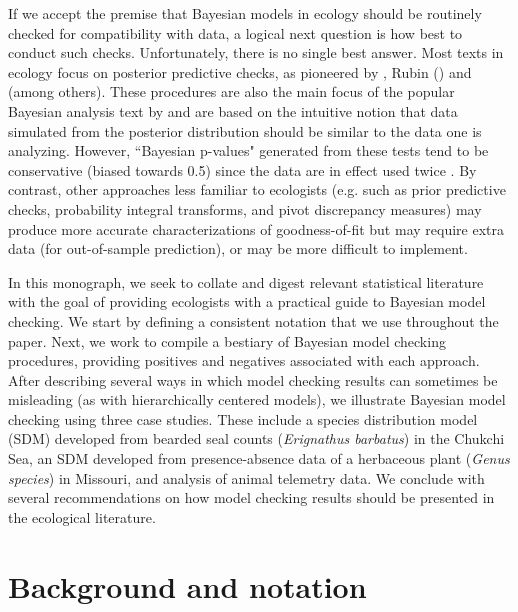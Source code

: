 \documentclass[12pt,english]{article}
\begin{document}
\begin{spacing}{1.9}
If we accept the premise that Bayesian models in ecology should be routinely checked for compatibility with data, a logical next question is how best to conduct such checks.  Unfortunately, there is no single best answer.  Most texts in ecology \citep[e.g.][]{KingEtAl2009,LinkBarker2010,KerySchaub2012} focus on posterior predictive checks, as pioneered by \citet{Guttman1967}, Rubin (\citeyear{Rubin1981,Rubin1984}) and \citet{GelmanEtAl1996} (among others).  These procedures are also the main focus of the popular Bayesian analysis text by \citet{GelmanEtAl2004} and are based on the intuitive notion that data simulated from the posterior distribution should be similar to the data one is analyzing.  However, ``Bayesian p-values" generated from these tests tend to be conservative (biased towards 0.5) since the data are in effect used twice \citep[once to fit the model and once to test the model;][]{BayarriBerger2000,RobinsEtAl2000}.  By contrast, other approaches less familiar to ecologists (e.g. such as prior predictive checks, probability integral transforms, and pivot discrepancy measures) may produce more accurate characterizations of goodness-of-fit but may require extra data (for out-of-sample prediction), or may be more difficult to implement.

In this monograph, we seek to collate and digest relevant statistical literature with the goal of providing ecologists with a practical guide to Bayesian model checking.  We start by defining a consistent notation that we use throughout the paper. Next, we work to compile a bestiary of Bayesian model checking procedures, providing positives and negatives associated with each approach.  After describing several ways in which model checking results can sometimes be misleading (as with hierarchically centered models), we illustrate Bayesian model checking using three case studies.  These include a species distribution model (SDM) developed from bearded seal counts (\textit{Erignathus barbatus}) in the Chukchi Sea, an SDM developed from presence-absence data of a herbaceous plant (\textit{Genus species}) in Missouri, and analysis of animal telemetry data.  We conclude with several recommendations on how model checking results should be presented in the ecological literature.



\section{Background and notation}


\end{spacing}
\end{document}
